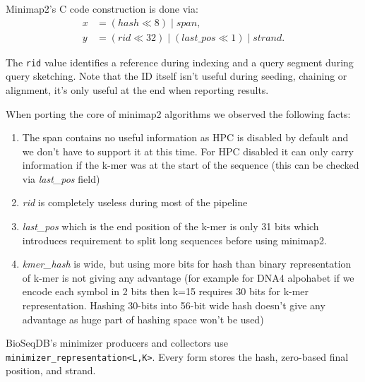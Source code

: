 Minimap2's C code construction is done via:
\begin{align}
  x&=(\mathit{hash}\ll 8)\mathbin{|}\mathit{span},\\
  y&=(\mathit{rid}\ll 32)\mathbin{|}
     (\mathit{last\_pos}\ll 1)\mathbin{|}\mathit{strand}.
\end{align}

\label{info:minimap-hpc}

The \texttt{rid} value identifies a reference during indexing and a query segment during query sketching. Note that the ID itself isn't useful during seeding, chaining or alignment, it's only useful at the end when reporting results.

When porting the core of minimap2 algorithms we observed the following facts:
\begin{enumerate}
  \item The span contains no useful information as HPC is disabled by default and we don't have to support it at this time. For HPC disabled it can only carry information if the k-mer was at the start of the sequence (this can be checked via \emph{last\_pos} field)
  \item \emph{rid} is completely useless during most of the pipeline
  \item \emph{last\_pos} which is the end position of the k-mer is only 31 bits which introduces requirement to split long sequences before using minimap2.
  \item \emph{kmer\_hash} is wide, but using more bits for hash than binary representation of k-mer is not giving any advantage (for example for DNA4 alpohabet if we encode each symbol in 2 bits then k=15 requires 30 bits for k-mer representation. Hashing 30-bits into 56-bit wide hash doesn't give any advantage as huge part of hashing space won't be used)
\end{enumerate}

BioSeqDB's minimizer producers and collectors use \texttt{minimizer\_representation<L,K>}.
Every form stores the hash, zero-based final position, and strand.

